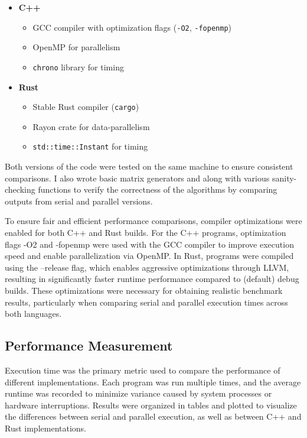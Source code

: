 \documentclass[12pt]{article}
\begin{document}
\begin{itemize}
    \item \textbf{C++}
          \begin{itemize}
              \item GCC compiler with optimization flags (\texttt{-O2}, \texttt{-fopenmp})
              \item OpenMP for parallelism
              \item \texttt{chrono} library for timing
          \end{itemize}

    \item \textbf{Rust}
          \begin{itemize}
              \item Stable Rust compiler (\texttt{cargo})
              \item Rayon crate for data-parallelism
              \item \texttt{std::time::Instant} for timing
          \end{itemize}
\end{itemize}

Both versions of the code were tested on the same machine to ensure consistent comparisons. I also wrote basic matrix generators and along with various
sanity-checking functions to verify the correctness of the algorithms by comparing outputs from serial and parallel versions.

To ensure fair and efficient performance comparisons, compiler optimizations were enabled for both C++ and Rust builds. For the C++ programs,
optimization flags -O2 and -fopenmp were used with the GCC compiler to improve execution speed and enable parallelization via OpenMP.
In Rust, programs were compiled using the --release flag, which enables aggressive optimizations through LLVM, resulting in significantly faster
runtime performance compared to (default) debug builds. These optimizations were necessary for obtaining realistic benchmark results, particularly when
comparing serial and parallel execution times across both languages.

\subsection*{Performance Measurement}

Execution time was the primary metric used to compare the performance of different implementations. Each program was run multiple times, and the average
runtime was recorded to minimize variance caused by system processes or hardware interruptions. Results were organized in tables and plotted to visualize
the differences between serial and parallel execution, as well as between C++ and Rust implementations.
\end{document}
